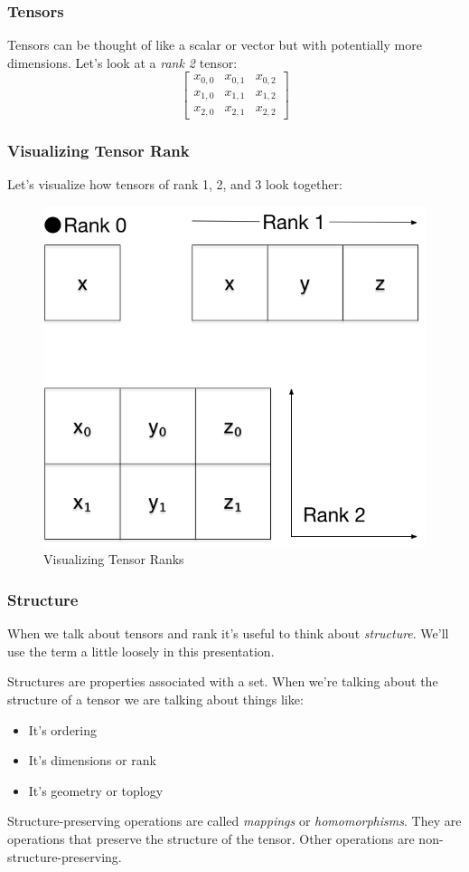 \documentclass{beamer}
\begin{document}
\begin{frame}[fragile]
  \frametitle{Tensors}

  Tensors can be thought of like a scalar or vector but with
  potentially more dimensions.  Let's look at a {\it rank 2} tensor:
  \[
    \begin{bmatrix}
      x_{0,0} & x_{0,1} & x_{0,2} \\
      x_{1,0} & x_{1,1} & x_{1,2} \\
      x_{2,0} & x_{2,1} & x_{2,2}
    \end{bmatrix}
  \]
\end{frame}

\begin{frame}
  \frametitle{Visualizing Tensor Rank}

  Let's visualize how tensors of rank 1, 2, and 3 look together:
  \begin{figure}
    \includegraphics[scale=0.3]{img/tensor_ranks}
    \caption{Visualizing Tensor Ranks}
  \end{figure}
\end{frame}

\begin{frame}
  \frametitle{Structure}

  When we talk about tensors and rank it's useful to think about
  \emph{structure}.  We'll use the term a little loosely in this
  presentation.

  Structures are properties associated with a set.  When we're talking
  about the structure of a tensor we are talking about things like:

  \begin{itemize}
  \item It's ordering
  \item It's dimensions or rank
  \item It's geometry or toplogy
  \end{itemize}

  Structure-preserving operations are called \emph{mappings} or
  \emph{homomorphisms}.  They are operations that preserve the
  structure of the tensor.  Other operations are
  non-structure-preserving.
\end{frame}
\end{document}
